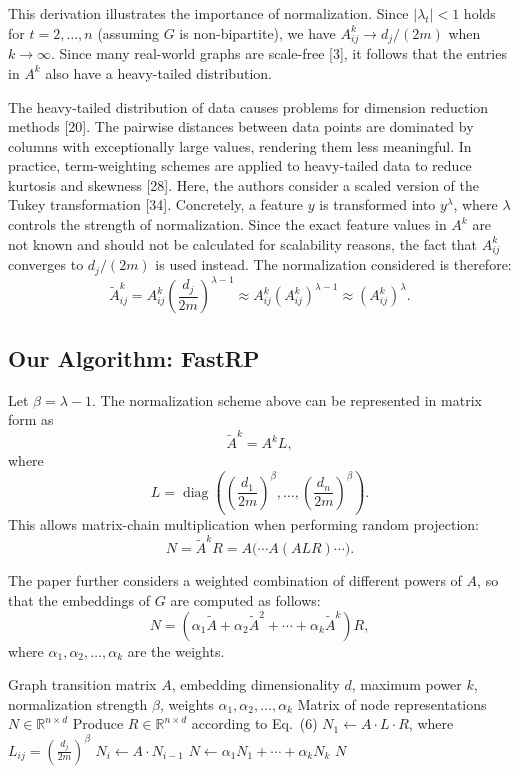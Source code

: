 \documentclass[11pt]{article}
\begin{document}
This derivation illustrates the importance of normalization. Since $|\lambda_t|<1$ holds for $t=2,\ldots,n$ (assuming $G$ is non-bipartite), we have $A^k_{ij} \to d_j/(2m)$ when $k \to \infty$. Since many real-world graphs are scale-free [3], it follows that the entries in $A^k$ also have a heavy-tailed distribution.

The heavy-tailed distribution of data causes problems for dimension reduction methods [20]. The pairwise distances between data points are dominated by columns with exceptionally large values, rendering them less meaningful. In practice, term-weighting schemes are applied to heavy-tailed data to reduce kurtosis and skewness [28]. Here, the authors consider a scaled version of the Tukey transformation [34]. Concretely, a feature $y$ is transformed into $y^{\lambda}$, where $\lambda$ controls the strength of normalization. Since the exact feature values in $A^k$ are not known and should not be calculated for scalability reasons, the fact that $A^k_{ij}$ converges to $d_j/(2m)$ is used instead. The normalization considered is therefore:
\begin{equation}
\widetilde{A}^k_{ij} = A^k_{ij}\left(\frac{d_j}{2m}\right)^{\lambda-1}
\approx A^k_{ij}\left(A^k_{ij}\right)^{\lambda-1}
\approx \left(A^k_{ij}\right)^{\lambda}.
\end{equation}

\subsection{Our Algorithm: FastRP}

Let $\beta = \lambda -1$. The normalization scheme above can be represented in matrix form as
\[
\widetilde{A}^k = A^k L,
\]
where
\[
L = \operatorname{diag}\left(\left(\frac{d_1}{2m}\right)^{\beta},\ldots,\left(\frac{d_n}{2m}\right)^{\beta}\right).
\]
This allows matrix-chain multiplication when performing random projection:
\[
N = \widetilde{A}^k R = A\bigl(\cdots A(A L R)\cdots\bigr).
\]

The paper further considers a weighted combination of different powers of $A$, so that the embeddings of $G$ are computed as follows:
\[
N = \left(\alpha_1 \widetilde{A} + \alpha_2 \widetilde{A}^2 + \cdots + \alpha_k \widetilde{A}^k\right)R,
\]
where $\alpha_1,\alpha_2,\ldots,\alpha_k$ are the weights.

\begin{algorithm}[H]
\caption{FastRP($A$)}
\begin{algorithmic}[1]
\Require Graph transition matrix $A$, embedding dimensionality $d$, maximum power $k$, normalization strength $\beta$, weights $\alpha_1,\alpha_2,\ldots,\alpha_k$
\Ensure Matrix of node representations $N \in \mathbb{R}^{n \times d}$
\State Produce $R \in \mathbb{R}^{n \times d}$ according to Eq.~(6)
\State $N_1 \gets A \cdot L \cdot R$, where $L_{ij} = \left(\frac{d_j}{2m}\right)^{\beta}$
    \State $N_i \gets A \cdot N_{i-1}$
\EndFor
\State $N \gets \alpha_1 N_1 + \cdots + \alpha_k N_k$
\State \Return $N$
\end{algorithmic}
\end{algorithm}
\end{document}
